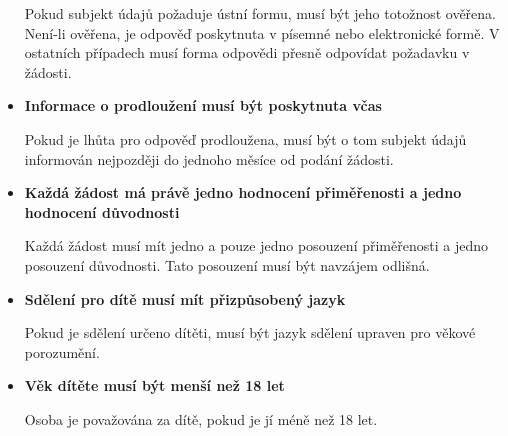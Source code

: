 \begin{itemize}
  \noindent Pokud subjekt údajů požaduje ústní formu, musí být jeho totožnost ověřena. Není-li ověřena, je odpověď poskytnuta v písemné nebo elektronické formě. V ostatních případech musí forma odpovědi přesně odpovídat požadavku v žádosti.


  \item \textbf{Informace o prodloužení musí být poskytnuta včas}


  \noindent Pokud je lhůta pro odpověď prodloužena, musí být o tom subjekt údajů informován nejpozději do jednoho měsíce od podání žádosti.

  \item \textbf{Každá žádost má právě jedno hodnocení přiměřenosti a jedno hodnocení důvodnosti}


  \noindent Každá žádost musí mít jedno a pouze jedno posouzení přiměřenosti a jedno posouzení důvodnosti. Tato posouzení musí být navzájem odlišná.


  \item \textbf{Sdělení pro dítě musí mít přizpůsobený jazyk}


  \noindent Pokud je sdělení určeno dítěti, musí být jazyk sdělení upraven pro věkové porozumění.

  \item \textbf{Věk dítěte musí být menší než 18 let}


  \noindent Osoba je považována za dítě, pokud je jí méně než 18 let.

\end{itemize}

